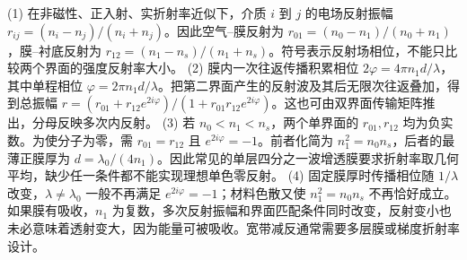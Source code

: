 (1) 在非磁性、正入射、实折射率近似下，介质 \(i\) 到 \(j\) 的电场反射振幅 \(r_{ij}=(n_i-n_j)/(n_i+n_j)\)。因此空气–膜反射为 \(r_{01}=(n_0-n_1)/(n_0+n_1)\)，膜–衬底反射为 \(r_{12}=(n_1-n_s)/(n_1+n_s)\)。符号表示反射场相位，不能只比较两个界面的强度反射率大小。
(2) 膜内一次往返传播积累相位 \(2\varphi=4\pi n_1d/\lambda\)，其中单程相位 \(\varphi=2\pi n_1d/\lambda\)。把第二界面产生的反射波及其后无限次往返叠加，得到总振幅 \(r=(r_{01}+r_{12}e^{2i\varphi})/(1+r_{01}r_{12}e^{2i\varphi})\)。这也可由双界面传输矩阵推出，分母反映多次内反射。
(3) 若 \(n_0<n_1<n_s\)，两个单界面的 \(r_{01},r_{12}\) 均为负实数。为使分子为零，需 \(r_{01}=r_{12}\) 且 \(e^{2i\varphi}=-1\)。前者化简为 \(n_1^2=n_0n_s\)，后者的最薄正膜厚为 \(d=\lambda_0/(4n_1)\)。因此常见的单层四分之一波增透膜要求折射率取几何平均，缺少任一条件都不能实现理想单色零反射。
(4) 固定膜厚时传播相位随 \(1/\lambda\) 改变，\(\lambda\ne\lambda_0\) 一般不再满足 \(e^{2i\varphi}=-1\)；材料色散又使 \(n_1^2=n_0n_s\) 不再恰好成立。如果膜有吸收，\(n_1\) 为复数，多次反射振幅和界面匹配条件同时改变，反射变小也未必意味着透射变大，因为能量可被吸收。宽带减反通常需要多层膜或梯度折射率设计。
